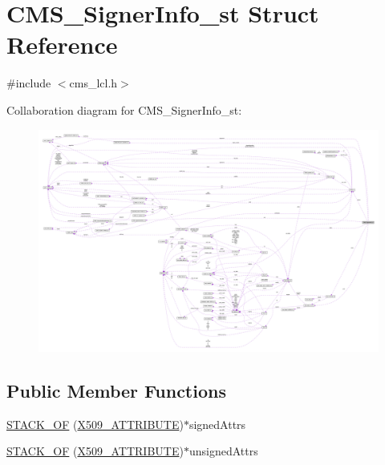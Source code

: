 \hypertarget{struct_c_m_s___signer_info__st}{}\section{C\+M\+S\+\_\+\+Signer\+Info\+\_\+st Struct Reference}
\label{struct_c_m_s___signer_info__st}


{\ttfamily \#include $<$cms\+\_\+lcl.\+h$>$}



Collaboration diagram for C\+M\+S\+\_\+\+Signer\+Info\+\_\+st\+:\nopagebreak
\begin{figure}[H]
\begin{center}
\leavevmode
\includegraphics[width=350pt]{struct_c_m_s___signer_info__st__coll__graph}
\end{center}
\end{figure}
\subsection*{Public Member Functions}
\begin{DoxyCompactItemize}
\item 
\hyperlink{struct_c_m_s___signer_info__st_aabc497e9c5609df52bc7aa31ba2731c9}{S\+T\+A\+C\+K\+\_\+\+OF} (\hyperlink{crypto_2x509_2x509_8h_aa4f1a62a9d2dd8cb6780fe2713737c0f}{X509\+\_\+\+A\+T\+T\+R\+I\+B\+U\+TE})$\ast$signed\+Attrs
\item 
\hyperlink{struct_c_m_s___signer_info__st_a72441567ab1f5bbf59de5dda4fb3e5af}{S\+T\+A\+C\+K\+\_\+\+OF} (\hyperlink{crypto_2x509_2x509_8h_aa4f1a62a9d2dd8cb6780fe2713737c0f}{X509\+\_\+\+A\+T\+T\+R\+I\+B\+U\+TE})$\ast$unsigned\+Attrs
\end{DoxyCompactItemize}
